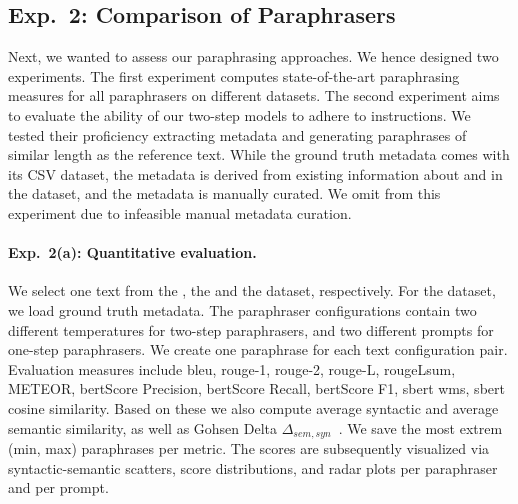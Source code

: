 \subsection{Exp.\ 2: Comparison of Paraphrasers}
\label{subsec:comp_paraphrasers_setup}

Next, we wanted to assess our paraphrasing approaches.
We hence designed two experiments.
The first experiment computes state-of-the-art paraphrasing measures for all paraphrasers on different datasets.
The second experiment aims to evaluate the ability of our two-step models to adhere to instructions.
We tested their proficiency extracting metadata and generating paraphrases of similar length as the reference text.
While the \dataBlog{} ground truth metadata comes with its CSV dataset, the \dataStudent{} metadata is derived from existing information about and in the dataset, and the \dataGutenberg{} metadata is manually curated.
We omit \dataPan{} from this experiment due to infeasible manual metadata curation.

\paragraph{Exp.\ 2(a): Quantitative evaluation.}

We select one text from the \dataBlog{}, the \dataGutenberg{} and the \dataStudent{} dataset, respectively.
For the \dataGutenberg{} dataset, we load ground truth metadata. %
The paraphraser configurations contain two different temperatures for two-step paraphrasers, and two different prompts for one-step paraphrasers.
We create one paraphrase for each text configuration pair.
Evaluation measures include \ac{bleu}, \ac{rouge}-1, \ac{rouge}-2, \ac{rouge}-L, \ac{rouge}\-Lsum, METEOR, \ac{bert}\-Score Precision, \ac{bert}\-Score Recall, \ac{bert}\-Score F1, \ac{sbert} \ac{wms}, \ac{sbert} cosine similarity.
Based on these we also compute average syntactic and average semantic similarity, as well as Gohsen Delta $\Delta_{sem,syn}$~\citep{gohsen_captions_2023}.
We save the most extrem (min, max) paraphrases per metric.
The scores are subsequently visualized via syntactic-semantic scatters, score distributions, and radar plots per paraphraser and per prompt. 

